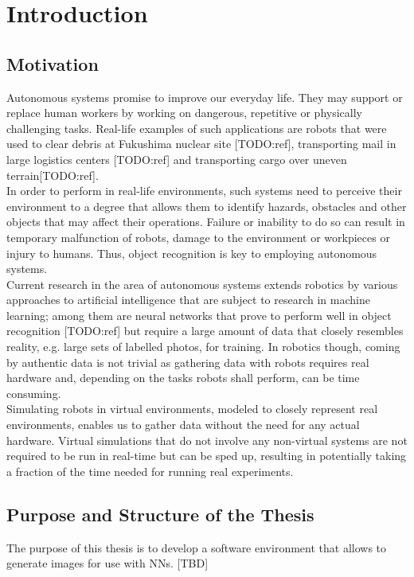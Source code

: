 \chapter{Introduction}

\section{Motivation}
Autonomous systems promise to improve our everyday life. They may support or replace human workers by working on dangerous, repetitive or physically challenging tasks. Real-life examples of such applications are robots that were used to clear debris at Fukushima nuclear site [TODO:ref], transporting mail in large logistics centers [TODO:ref] and transporting cargo over uneven terrain[TODO:ref].\\
In order to perform in real-life environments, such systems need to perceive their environment to a degree that allows them to identify hazards, obstacles and other objects that may affect their operations. Failure or inability to do so can result in temporary malfunction of robots, damage to the environment or workpieces or injury to humans. Thus, object recognition is key to employing autonomous systems.\\
Current research in the area of autonomous systems extends robotics by various approaches to artificial intelligence that are subject to research in machine learning; among them are neural networks that prove to perform well in object recognition [TODO:ref] but require a large amount of data that closely resembles reality, e.g. large sets of labelled photos, for training. In robotics though, coming by authentic data is not trivial as gathering data with robots requires real hardware and, depending on the tasks robots shall perform, can be time consuming.\\
Simulating robots in virtual environments, modeled to closely represent real environments, enables us to gather data without the need for any actual hardware. Virtual simulations that do not involve any non-virtual systems are not required to be run in real-time but can be sped up, resulting in potentially taking a fraction of the time needed for running real experiments.

\section{Purpose and Structure of the Thesis}
The purpose of this thesis is to develop a software environment that allows to generate images for use with \acp{NN}.
[TBD]